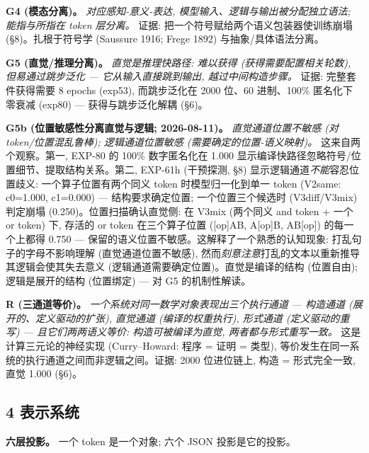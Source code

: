 \documentclass[
]{article}
\begin{document}
\textbf{G4 (模态分离)。} \emph{对应感知-意义-表达,
模型输入、逻辑与输出被分配独立语法; 能指与所指在 token 层分离。} 证据:
把一个符号赋给两个语义包装器使训练崩塌 (§8)。扎根于符号学 (Saussure
1916; Frege 1892) 与抽象/具体语法分离。

\textbf{G5 (直觉/推理分离)。} \emph{直觉是推理快路径: 难以获得
(获得需要配置相关轮数), 但易通过跳步泛化 --- 它从输入直接跳到输出,
越过中间构造步骤。} 证据: 完整套件获得需要 8 epochs (exp53),
而跳步泛化在 2000 位、60 进制、100\% 匿名化下零衰减 (exp80) ---
获得与跳步泛化解耦 (§6)。

\textbf{G5b (位置敏感性分离直觉与逻辑; 2026-08-11)。}
\emph{直觉通道位置不敏感 (对 token/位置混乱鲁棒); 逻辑通道位置敏感
(需要确定的位置-语义映射)。} 这来自两个观察。第一, EXP-80 的 100\%
数字匿名化在 1.000 显示编译快路径忽略符号/位置细节、提取结构关系。第二,
EXP-61h (干预探测, §8) 显示逻辑通道\emph{不能}容忍位置歧义:
一个算子位置有两个同义 token 时模型归一化到单一 token (V2same: c0=1.000,
c1=0.000) --- 结构要求确定位置; 一个位置三个候选时 (V3diff/V3mix)
判定崩塌 (0.250)。位置扫描确认直觉侧: 在 V3mix (两个同义 and token +
一个 or token) 下, 存活的 or token 在三个算子位置 ({[}op{]}AB,
A{[}op{]}B, AB{[}op{]}) 的每一个上都得 0.750 ---
保留的语义位置不敏感。这解释了一个熟悉的认知现象:
打乱句子的字母不影响理解 (直觉通道位置不敏感),
然而\emph{刻意注意}打乱的文本以重新推导其逻辑会使其失去意义
(逻辑通道需要确定位置)。直觉是编译的结构 (位置自由); 逻辑是展开的结构
(位置绑定) --- 对 G5 的机制性解读。

\textbf{R (三通道等价)。} \emph{一个系统对同一数学对象表现出三个执行通道
--- 构造通道 (展开的、定义驱动的扩张), 直觉通道 (编译的权重执行),
形式通道 (定义驱动的重写) --- 且它们两两语义等价: 构造可被编译为直觉,
两者都与形式重写一致。} 这是计算三元论的神经实现 (Curry--Howard: 程序 =
证明 = 类型), 等价发生在同一系统的执行通道之间而非逻辑之间。证据: 2000
位进位链上, 构造 = 形式完全一致, 直觉 1.000 (§6)。

\subsection{4 表示系统}\label{ux8868ux793aux7cfbux7edf}

\textbf{六层投影。} 一个 token 是一个对象; 六个 JSON 投影是它的投影。
\end{document}
